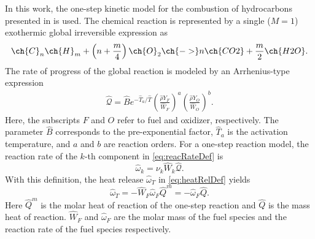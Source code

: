 In this work,  the one-step kinetic model for the combustion of hydrocarbons presented in \textcite{fernandez-tarrazoSimpleOnestepChemistry2006} is used. The chemical reaction is represented by a single ($M = 1$)  exothermic global irreversible expression as
\begin{equation}
	\ch{C}_n \ch{H}_m + \left(n+\frac{m}{4}\right) \ch{O}_2\ch{ -> } n \ch{CO2} + \frac{m}{2} \ch{H2O}.
\end{equation}
The rate of progress of the global reaction is modeled by an Arrhenius-type expression
\begin{align}
	\hat{\mathcal{Q}}= \hat B e^{-\hat T_a/\hat T} \left(\frac{\hat \rho Y_F}{\hat W_F}\right)^a \left(\frac{\hat \rho Y_O}{\hat W_O}\right)^b . \label{eq:DimArr}
\end{align}%
Here, the subscripts $F$ and $O$ refer to fuel and oxidizer, respectively. The parameter $\hat{B}$ corresponds to the pre-exponential factor, $\hat T_a$ is the activation temperature, and $a$ and $b$ are reaction orders. For a one-step reaction model, the reaction rate of the $k$-th component in \cref{eq:reacRateDef} is
\begin{equation}
	\hat \omega_k  =  \nu_{k} \hat W_k\hat{\mathcal{Q}}.
\end{equation}
With this definition, the heat release $\hat \omega_T$ in \cref{eq:heatRelDef} yields
\begin{equation}
	\hat \omega_T = - \hat W_F \hat \omega_F\hat Q^m = - \hat \omega_F\hat Q .
\end{equation}
Here $\hat Q^m$ is the molar heat of reaction of the one-step reaction and $\hat Q$ is the mass heat of reaction. $\hat W_F$ and $ \hat \omega_F$ are the molar mass of the fuel species and the reaction rate of the fuel species respectively.


